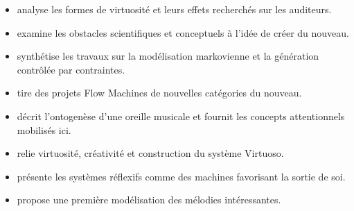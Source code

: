 \documentclass[11pt,a4paper]{article}
\begin{document}
\begin{itemize}
  \item \textcite{pachet2026virtuosite} analyse les formes de virtuosité et leurs
        effets recherchés sur les auditeurs.
  \item \textcite{pachet2026impossibilite} examine les obstacles scientifiques
        et conceptuels à l'idée de créer du nouveau.
  \item \textcite{pachet2026markov} synthétise les travaux sur la modélisation
        markovienne et la génération contrôlée par contraintes.
  \item \textcite{pachet2021assisted} tire des projets Flow Machines de nouvelles
        catégories du nouveau.
  \item \textcite{pachet2018oreille} décrit l'ontogenèse d'une oreille musicale
        et fournit les concepts attentionnels mobilisés ici.
  \item \textcite{pachet2012virtuosity} relie virtuosité, créativité et
        construction du système Virtuoso.
  \item \textcite{pachet2008machines} présente les systèmes réflexifs comme des
        machines favorisant la sortie de soi.
  \item \textcite{pachet2006clefs} propose une première modélisation des mélodies
        intéressantes.
\end{itemize}

\printbibliography[title={Références}]
\end{document}
